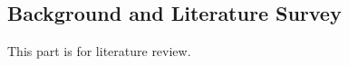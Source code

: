 \subsection{Background and Literature Survey} \label{sub:background}

This part is for literature review.


